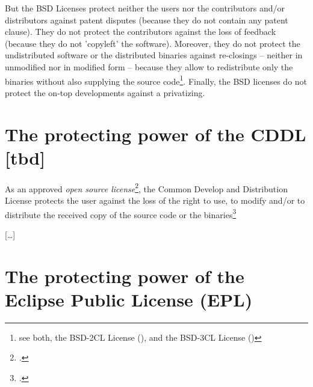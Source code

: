 But the BSD Licenses protect neither the users nor the contributors
and/or distributors against patent disputes (because they do not contain any
patent clause). They do not protect the contributors against the loss of
feedback (because they do not 'copyleft' the software). Moreover, they do not
protect the undistributed software or the distributed binaries against
re-closings -- neither in unmodified nor in modified form -- because they
allow to redistribute only the binaries without also supplying the source
code\footnote{see both, the BSD-2CL License (\cite[cf.][\nopage
wp]{BsdLicense2Clause}), and the BSD-3CL License (\cite[cf.][\nopage
wp]{BsdLicense3Clause})}. Finally, the BSD licenses do not protect the on-top
developments against a privatizing.

\section{The protecting power of the CDDL [tbd]}
\label{sec:ProtectPowerOfCDDL}

As an approved \emph{open source license}\footcite[cf.][\nopage wp]{OSI2012b},
the Common Develop and Distribution License protects the user
against the loss of the right to use, to modify and/or to distribute the
received copy of the source code or the binaries\footcite[cf.][\nopage wp. 
§?]{Cddl10OsiLicense2004a}

[\ldots]

\section{The protecting power of the Eclipse Public License (EPL)}
\label{sec:ProtectingPowerOfEpl}

